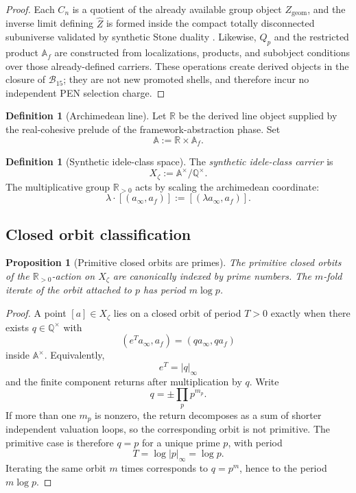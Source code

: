 \documentclass[11pt,a4paper]{article}
\theoremstyle{plain}
\newtheorem{proposition}[theorem]{Proposition}
\theoremstyle{definition}
\newtheorem{definition}[theorem]{Definition}
\newcommand{\Q}{\mathbb{Q}}
\newcommand{\R}{\mathbb{R}}
\newcommand{\A}{\mathbb{A}}
\newcommand{\Af}{\mathbb{A}_f}
\newcommand{\Bcal}{\mathcal{B}}
\begin{document}
\begin{proof}
Each $C_n$ is a quotient of the already available group object $Z_{\mathrm{geom}}$, and the inverse limit defining $\widehat Z$ is formed inside the compact totally disconnected subuniverse validated by synthetic Stone duality \citep{cherubini-stone}. Likewise, $Q_p$ and the restricted product $\Af$ are constructed from localizations, products, and subobject conditions over those already-defined carriers. These operations create derived objects in the closure of $\Bcal_{15}$; they are not new promoted shells, and therefore incur no independent PEN selection charge.
\end{proof}

\begin{definition}[Archimedean line]
Let $\R$ be the derived line object supplied by the real-cohesive prelude of the framework-abstraction phase. Set
\[
  \A:=\R\times \Af.
\]
\end{definition}

\begin{definition}[Synthetic idele-class space]
\label{def:xzeta}
The \emph{synthetic idele-class carrier} is
\[
  X_{\zeta}:=\A^{\times}/\Q^{\times}.
\]
The multiplicative group $\R_{>0}$ acts by scaling the archimedean coordinate:
\[
  \lambda\cdot[(a_{\infty},a_f)] := [ (\lambda a_{\infty}, a_f) ].
\]
\end{definition}

\subsection{Closed orbit classification}

\begin{proposition}[Primitive closed orbits are primes]
\label{prop:prime-orbits}
The primitive closed orbits of the $\R_{>0}$-action on $X_{\zeta}$ are canonically indexed by prime numbers. The $m$-fold iterate of the orbit attached to $p$ has period $m\log p$.
\end{proposition}

\begin{proof}
A point $[a]\in X_{\zeta}$ lies on a closed orbit of period $T>0$ exactly when there exists $q\in \Q^{\times}$ with
\[
  (e^{T}a_{\infty},a_f) = (qa_{\infty},qa_f)
\]
inside $\A^{\times}$. Equivalently,
\[
  e^{T}=|q|_{\infty}
\]
and the finite component returns after multiplication by $q$. Write
\[
  q=\pm \prod_{p} p^{m_p}.
\]
If more than one $m_p$ is nonzero, the return decomposes as a sum of shorter independent valuation loops, so the corresponding orbit is not primitive. The primitive case is therefore $q=p$ for a unique prime $p$, with period
\[
  T=\log |p|_{\infty}=\log p.
\]
Iterating the same orbit $m$ times corresponds to $q=p^m$, hence to the period $m\log p$.
\end{proof}
\end{document}
